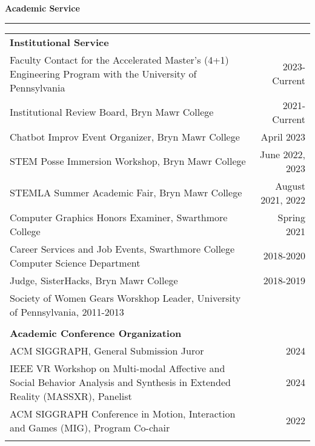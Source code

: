 \needspace{6em}
{\large {\bf Academic Service}}
\vspace{0.1cm}
\hrule
\medskip
\begin{tabular*}{7.1in}{@{}l@{\extracolsep\fill}r}

{\bf Institutional Service } & \\
Faculty Contact for the Accelerated Master's (4+1) Engineering Program with the University of Pennsylvania & 2023-Current \\
Institutional Review Board, Bryn Mawr College & 2021-Current \\
Chatbot Improv Event Organizer, Bryn Mawr College & April 2023 \\
STEM Posse Immersion Workshop, Bryn Mawr College & June 2022, 2023 \\
STEMLA Summer Academic Fair, Bryn Mawr College & August 2021, 2022 \\
Computer Graphics Honors Examiner, Swarthmore College & Spring 2021 \\
Career Services and Job Events, Swarthmore College Computer Science Department & 2018-2020 \\
Judge, SisterHacks, Bryn Mawr College & 2018-2019 \\
Society of Women Gears Worskhop Leader, University of Pennsylvania, 2011-2013 \\
\phantom{yommomma} & \phantom{2002}\\

{\bf Academic Conference Organization } & \\
ACM SIGGRAPH, General Submission Juror & 2024\\
IEEE VR Workshop on Multi-modal Affective and Social Behavior Analysis and Synthesis in Extended Reality (MASSXR), Panelist & 2024 \\
ACM SIGGRAPH Conference in Motion, Interaction and Games (MIG), Program Co-chair & 2022 \\
\phantom{yommomma} & \phantom{2002}\\


\end{tabular*}
